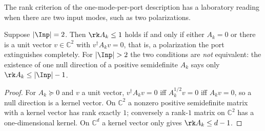 
The rank criterion of the one-mode-per-port description has a laboratory
reading when there are two input modes, such as two polarizations.

\begin{corollary}\label{cor:extinction}
Suppose $|\Inp|=2$. Then $\rk A_k\le1$ holds if and only if either $A_k=0$ or
there is a unit vector $v\in\mathbb{C}^{2}$ with $v^\dagger A_kv=0$, that is,
a polarization the port extinguishes completely. For $|\Inp|>2$ the two
conditions are \emph{not} equivalent: the existence of one null direction of a
positive semidefinite $A_k$ says only $\rk A_k\le|\Inp|-1$.
\end{corollary}

\begin{proof}
For $A_k\succeq0$ and $v$ a unit vector, $v^\dagger A_kv=0$ iff
$A_k^{1/2}v=0$ iff $A_kv=0$, so a null direction is a kernel vector. On
$\mathbb{C}^2$ a nonzero positive semidefinite matrix with a kernel vector has
rank exactly $1$; conversely a rank-$1$ matrix on $\mathbb{C}^2$ has a
one-dimensional kernel. On $\mathbb{C}^d$ a kernel vector only gives
$\rk A_k\le d-1$.
\end{proof}
